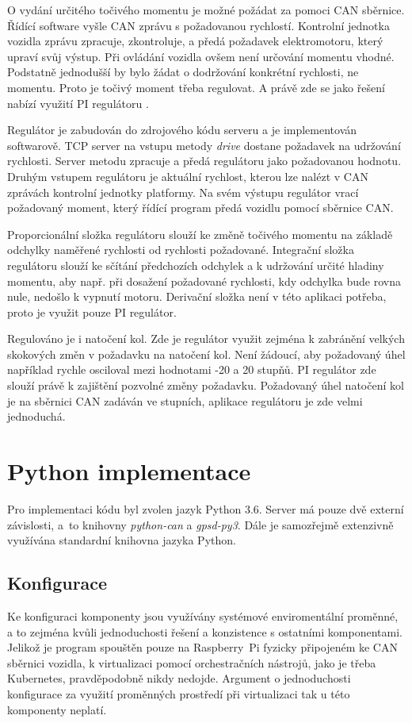 \documentclass[czech, bachelor]{diploma}
\begin{document}
O vydání určitého točivého momentu je možné požádat za pomoci CAN sběrnice. Řídící software vyšle CAN zprávu s požadovanou
rychlostí. Kontrolní jednotka vozidla zprávu zpracuje, zkontroluje, a předá požadavek elektromotoru, který upraví svůj výstup.
Při ovládání vozidla ovšem není určování momentu vhodné. Podstatně jednodušší by bylo žádat o dodržování konkrétní rychlosti,
ne momentu. Proto je točivý moment třeba regulovat. A právě zde se jako řešení nabízí využití PI regulátoru
\cite{pid-controller-source}.

Regulátor je zabudován do zdrojového kódu serveru a je implementován softwarově. TCP server na vstupu metody \emph{drive} dostane
požadavek na udržování rychlosti. Server metodu zpracuje a předá regulátoru jako požadovanou hodnotu. Druhým vstupem regulátoru
je aktuální rychlost, kterou lze nalézt v CAN zprávách kontrolní jednotky platformy. Na svém výstupu regulátor vrací požadovaný
moment, který řídící program předá vozidlu pomocí sběrnice CAN.

Proporcionální složka regulátoru slouží ke změně točivého momentu na základě odchylky naměřené rychlosti od rychlosti požadované.
Integrační složka regulátoru slouží ke sčítání předchozích odchylek a k udržování určité hladiny momentu, aby např. při dosažení
požadované rychlosti, kdy odchylka bude rovna nule, nedošlo k vypnutí motoru. Derivační složka není v této aplikaci potřeba, proto
je využit pouze PI regulátor.

Regulováno je i natočení kol. Zde je regulátor využit zejména k zabránění velkých skokových změn v požadavku na natočení kol. Není
žádoucí, aby požadovaný úhel například rychle osciloval mezi hodnotami -20 a 20 stupňů. PI regulátor zde slouží právě k zajištění
pozvolné změny požadavku. Požadovaný úhel natočení kol je na sběrnici CAN zadáván ve stupních, aplikace regulátoru je zde velmi
jednoduchá.

\section{Python implementace}

Pro implementaci kódu byl zvolen jazyk Python 3.6. Server má pouze dvě externí závislosti, a~to knihovny \emph{python-can} a
\emph{gpsd-py3}. Dále je samozřejmě extenzivně využívána standardní knihovna jazyka Python.

\subsection{Konfigurace}
Ke konfiguraci komponenty jsou využívány systémové enviromentální proměnné, a to zejména kvůli jednoduchosti řešení a konzistence
s ostatními komponentami. Jelikož je program spouštěn pouze na Raspberry~Pi fyzicky připojeném ke CAN sběrnici vozidla,
k virtualizaci pomocí orchestračních nástrojů, jako je třeba Kubernetes, pravděpodobně nikdy nedojde. Argument o jednoduchosti
konfigurace za využití proměnných prostředí při virtualizaci tak u této komponenty neplatí.
\end{document}
